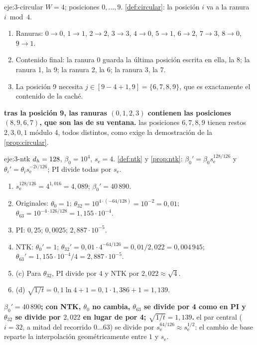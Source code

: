 \begin{solucion}{eje:3-circular}
\datos $W=4$; posiciones $0,\dots,9$.
\planteamiento \cref{def:circular}: la posición $i$ va a la ranura $i\bmod 4$.
\pasos
\begin{enumerate}[label=\arabic*.]
  \item Ranuras: $0\to 0$, $1\to 1$, $2\to 2$, $3\to 3$, $4\to 0$, $5\to 1$, $6\to 2$, $7\to 3$, $8\to 0$, $9\to 1$.
  \item Contenido final: la ranura 0 guarda la última posición escrita en ella, la 8; la ranura 1, la 9; la ranura 2, la 6; la ranura 3, la 7.
  \item La posición 9 necesita $j\in[9-4+1,9]=\{6,7,8,9\}$, que es exactamente el contenido de la caché.
\end{enumerate}
\resultado \textbf{tras la posición 9, las ranuras $(0,1,2,3)$ contienen las posiciones $(8,9,6,7)$, que son las de su ventana.}
\comprobacion las posiciones $6,7,8,9$ tienen restos $2,3,0,1$ módulo 4, todos distintos, como exige la demostración de la \cref{prop:circular}.
\end{solucion}

\begin{solucion}{eje:3-ntk}
\datos $d_{h}=128$, $\beta_0=10^{4}$, $s_{\mathrm{e}}=4$.
\planteamiento \cref{def:ntk} y \cref{prop:ntk}: $\beta_0'=\beta_0s_{\mathrm{e}}^{128/126}$ y $\theta_i'=\theta_is_{\mathrm{e}}^{-2i/126}$; PI divide todas por $s_{\mathrm{e}}$.
\pasos
\begin{enumerate}[label=\arabic*.]
  \item $s_{\mathrm{e}}^{128/126}=4^{1{,}016}=4{,}089$; $\beta_0'=40\,890$.
  \item Originales: $\theta_0=1$; $\theta_{32}=10^{4\cdot(-64/128)}=10^{-2}=0{,}01$; $\theta_{63}=10^{-4\cdot 126/128}=1{,}155\cdot 10^{-4}$.
  \item PI: $0{,}25$; $0{,}0025$; $2{,}887\cdot 10^{-5}$.
  \item NTK: $\theta_0'=1$; $\theta_{32}'=0{,}01\cdot 4^{-64/126}=0{,}01/2{,}022=0{,}004\,945$; $\theta_{63}'=1{,}155\cdot 10^{-4}/4=2{,}887\cdot 10^{-5}$.
  \item (c) Para $\theta_{32}$, PI divide por $4$ y NTK por $2{,}022\approx\sqrt{4}$.
  \item (d) $\sqrt{1/t}=0{,}1\ln 4+1=0{,}1\cdot 1{,}386+1=1{,}139$.
\end{enumerate}
\resultado \textbf{$\beta_0'=40\,890$; con NTK, $\theta_0$ no cambia, $\theta_{63}$ se divide por 4 como en PI y $\theta_{32}$ se divide por $2{,}022$ en lugar de por 4; $\sqrt{1/t}=1{,}139$.}
\comprobacion el par central ($i=32$, a mitad del recorrido $0\dots 63$) se divide por $s_{\mathrm{e}}^{64/126}\approx s_{\mathrm{e}}^{1/2}$: el cambio de base reparte la interpolación geométricamente entre $1$ y $s_{\mathrm{e}}$.
\end{solucion}


